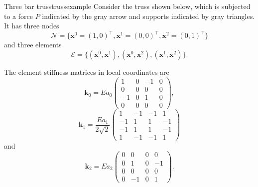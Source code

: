 \begin{example}{Three bar truss}{trussexample}
    Consider the truss shown below, which is subjected to a force $P$ indicated by the gray arrow and supports indicated by gray triangles. It has three nodes 
    \begin{equation}
        \mathcal{N} = \{\mathbf{x}^0=(1,0)^\top, \mathbf{x}^1=(0,0)^\top,\mathbf{x}^2=(0,1)^\top \}
    \end{equation}
    and three elements 
    \begin{equation}
        \mathcal{E} = \{(\mathbf{x}^0, \mathbf{x}^1), (\mathbf{x}^0, \mathbf{x}^2), (\mathbf{x}^1, \mathbf{x}^2)\}.
    \end{equation}

    \begin{center}
        
    \end{center}

    The element stiffness matrices in local coordinates are 
    \begin{equation}
        \mathbf{k}_0 = E a_0
        \begin{pmatrix}
             1 & 0 & -1 & 0 \\
             0 & 0 &  0 & 0 \\
            -1 & 0 &  1 & 0 \\
             0 & 0 &  0 & 0
        \end{pmatrix},
    \end{equation}
    \begin{equation}
        \mathbf{k}_1 = \frac{E a_1}{2\sqrt{2}}
        \begin{pmatrix}
             1 & -1 & -1 &  1 \\
            -1 &  1 &  1 & -1 \\
            -1 &  1 &  1 & -1 \\
             1 & -1 & -1 &  1
        \end{pmatrix}
    \end{equation}
    and 
    \begin{equation}
        \mathbf{k}_2 = E a_2
        \begin{pmatrix}
            0 &  0 & 0 &  0 \\
            0 &  1 & 0 & -1 \\
            0 &  0 & 0 &  0 \\
            0 & -1 & 0 &  1 
        \end{pmatrix}.
    \end{equation}


\end{example}
